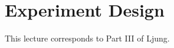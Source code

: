 
\mainmatter
\setcounter{page}{1}

\lectureseries[\course]{\course}

\date{December 8, 2009}

\setaddress

\setcounter{lecture}{18}
\setcounter{chapter}{18}


\section{Experiment Design}
This lecture corresponds to Part III of Ljung.
